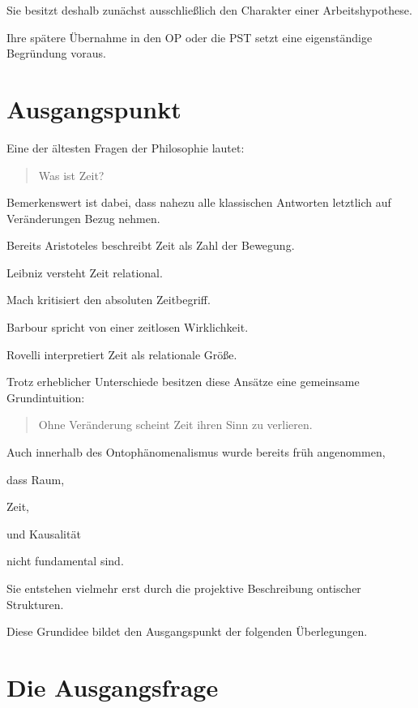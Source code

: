 \documentclass[11pt,a4paper]{article}
\begin{document}
Sie besitzt deshalb zunächst ausschließlich den Charakter
einer Arbeitshypothese.

Ihre spätere Übernahme in den OP oder die PST setzt
eine eigenständige Begründung voraus.

\section{Ausgangspunkt}

Eine der ältesten Fragen der Philosophie lautet:

\begin{quote}

Was ist Zeit?

\end{quote}

Bemerkenswert ist dabei, dass nahezu alle klassischen
Antworten letztlich auf Veränderungen Bezug nehmen.

Bereits Aristoteles beschreibt Zeit als Zahl der Bewegung.

Leibniz versteht Zeit relational.

Mach kritisiert den absoluten Zeitbegriff.

Barbour spricht von einer zeitlosen Wirklichkeit.

Rovelli interpretiert Zeit als relationale Größe.

Trotz erheblicher Unterschiede besitzen diese Ansätze
eine gemeinsame Grundintuition:

\begin{quote}

Ohne Veränderung scheint Zeit ihren Sinn zu verlieren.

\end{quote}

Auch innerhalb des Ontophänomenalismus wurde bereits
früh angenommen,

dass Raum,

Zeit,

und Kausalität

nicht fundamental sind.

Sie entstehen vielmehr erst durch die projektive
Beschreibung ontischer Strukturen.

Diese Grundidee bildet den Ausgangspunkt der folgenden
Überlegungen.

\section{Die Ausgangsfrage}
\end{document}
